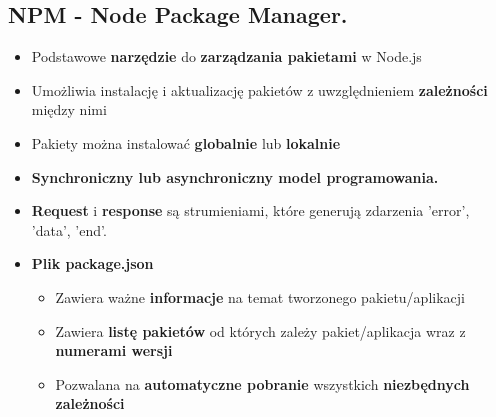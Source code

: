 \documentclass[../main.tex]{subfiles}
\begin{document}
    \subsection{NPM - Node Package Manager.}
    \begin{itemize}
        \item Podstawowe \textbf{narzędzie} do \textbf{zarządzania pakietami} w Node.js
        \item Umożliwia instalację i aktualizację pakietów z uwzględnieniem \textbf{zależności} między nimi
        \item Pakiety można instalować \textbf{globalnie} lub \textbf{lokalnie}
        \item \textbf{Synchroniczny lub asynchroniczny model programowania.}
        \item  \textbf{Request} i \textbf{response} są strumieniami, które generują zdarzenia 'error', 'data', 'end'.
        \item \textbf{Plik package.json}
        \begin{itemize}
            \item Zawiera ważne \textbf{informacje} na temat tworzonego pakietu/aplikacji
            \item Zawiera \textbf{listę pakietów} od których zależy pakiet/aplikacja wraz z \textbf{numerami wersji}
            \item Pozwalana na \textbf{automatyczne pobranie} wszystkich \textbf{niezbędnych zależności}
        \end{itemize}
    \end{itemize}
\end{document}
